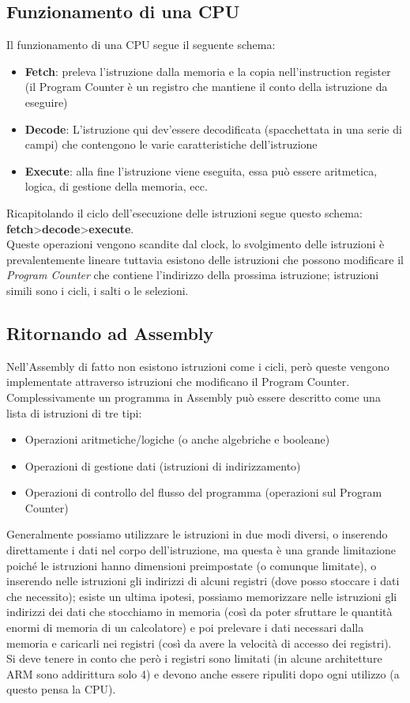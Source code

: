 \subsection{Funzionamento di una CPU}
Il funzionamento di una CPU segue il seguente schema:
\begin{itemize}[noitemsep]
	\item \textbf{Fetch}: preleva l’istruzione dalla memoria e la copia nell’instruction register (il Program Counter è un registro che mantiene il conto della istruzione da eseguire)
	\item \textbf{Decode}: L’istruzione qui dev’essere decodificata (spacchettata in una serie di campi) che contengono le varie caratteristiche dell’istruzione
	\item \textbf{Execute}:  alla fine l’istruzione viene eseguita, essa può essere aritmetica, logica, di gestione della memoria, ecc.
\end{itemize}
Ricapitolando il ciclo dell’esecuzione delle istruzioni segue questo schema:
\textbf{fetch}>\textbf{decode}>\textbf{execute}.\\
Queste operazioni vengono scandite dal clock, lo svolgimento delle istruzioni è prevalentemente lineare tuttavia esistono delle istruzioni che possono modificare il \textit{Program Counter }che contiene l’indirizzo della prossima istruzione; istruzioni simili sono i cicli, i salti o le selezioni.

\subsection{Ritornando ad Assembly}
Nell’Assembly di fatto non esistono istruzioni come i cicli, però queste vengono implementate attraverso istruzioni che modificano il Program Counter.
Complessivamente un programma in Assembly può essere descritto come una lista di istruzioni di tre tipi: 
\begin{itemize}[noitemsep]
	\item Operazioni aritmetiche/logiche (o anche algebriche e booleane)
	\item Operazioni di gestione dati (istruzioni di indirizzamento)
	\item Operazioni di controllo del flusso del programma (operazioni sul Program Counter) 
\end{itemize}
Generalmente possiamo utilizzare le istruzioni in due modi diversi, o inserendo direttamente i dati nel corpo dell'istruzione, ma questa è una grande limitazione poiché le istruzioni hanno dimensioni preimpostate (o comunque limitate), o inserendo nelle istruzioni gli indirizzi di alcuni registri (dove posso stoccare i dati che necessito); esiste un ultima ipotesi, possiamo memorizzare nelle istruzioni gli indirizzi dei dati che stocchiamo in memoria (così da poter sfruttare le quantità enormi di memoria di un calcolatore) e poi prelevare i dati necessari dalla memoria e caricarli nei registri (così da avere la velocità di accesso dei registri).\\
Si deve tenere in conto che però i registri sono limitati (in alcune architetture ARM sono addirittura solo 4) e devono anche essere ripuliti dopo ogni utilizzo (a questo pensa la CPU).
